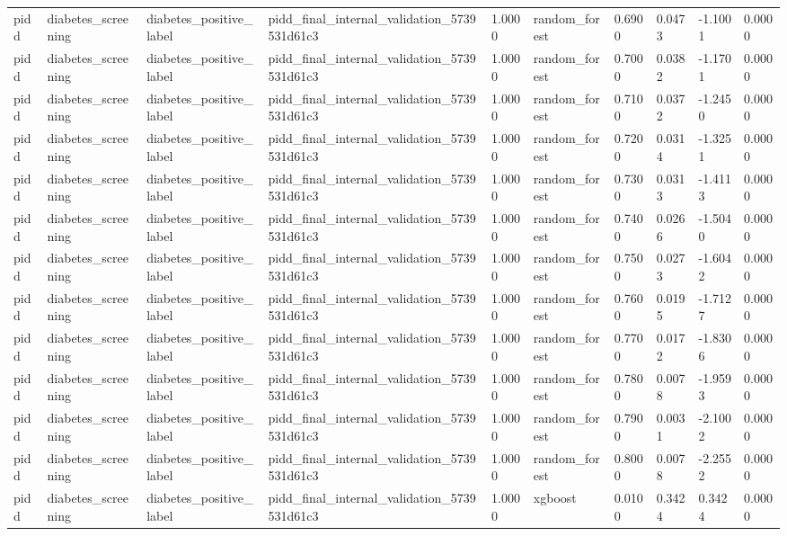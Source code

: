 \begin{tabular}{llllllllll}
pidd & diabetes\_screening & diabetes\_positive\_label & pidd\_final\_internal\_validation\_5739531d61c3 & 1.0000 & random\_forest & 0.6900 & 0.0473 & -1.1001 & 0.0000 \\
pidd & diabetes\_screening & diabetes\_positive\_label & pidd\_final\_internal\_validation\_5739531d61c3 & 1.0000 & random\_forest & 0.7000 & 0.0382 & -1.1701 & 0.0000 \\
pidd & diabetes\_screening & diabetes\_positive\_label & pidd\_final\_internal\_validation\_5739531d61c3 & 1.0000 & random\_forest & 0.7100 & 0.0372 & -1.2450 & 0.0000 \\
pidd & diabetes\_screening & diabetes\_positive\_label & pidd\_final\_internal\_validation\_5739531d61c3 & 1.0000 & random\_forest & 0.7200 & 0.0314 & -1.3251 & 0.0000 \\
pidd & diabetes\_screening & diabetes\_positive\_label & pidd\_final\_internal\_validation\_5739531d61c3 & 1.0000 & random\_forest & 0.7300 & 0.0313 & -1.4113 & 0.0000 \\
pidd & diabetes\_screening & diabetes\_positive\_label & pidd\_final\_internal\_validation\_5739531d61c3 & 1.0000 & random\_forest & 0.7400 & 0.0266 & -1.5040 & 0.0000 \\
pidd & diabetes\_screening & diabetes\_positive\_label & pidd\_final\_internal\_validation\_5739531d61c3 & 1.0000 & random\_forest & 0.7500 & 0.0273 & -1.6042 & 0.0000 \\
pidd & diabetes\_screening & diabetes\_positive\_label & pidd\_final\_internal\_validation\_5739531d61c3 & 1.0000 & random\_forest & 0.7600 & 0.0195 & -1.7127 & 0.0000 \\
pidd & diabetes\_screening & diabetes\_positive\_label & pidd\_final\_internal\_validation\_5739531d61c3 & 1.0000 & random\_forest & 0.7700 & 0.0172 & -1.8306 & 0.0000 \\
pidd & diabetes\_screening & diabetes\_positive\_label & pidd\_final\_internal\_validation\_5739531d61c3 & 1.0000 & random\_forest & 0.7800 & 0.0078 & -1.9593 & 0.0000 \\
pidd & diabetes\_screening & diabetes\_positive\_label & pidd\_final\_internal\_validation\_5739531d61c3 & 1.0000 & random\_forest & 0.7900 & 0.0031 & -2.1002 & 0.0000 \\
pidd & diabetes\_screening & diabetes\_positive\_label & pidd\_final\_internal\_validation\_5739531d61c3 & 1.0000 & random\_forest & 0.8000 & 0.0078 & -2.2552 & 0.0000 \\
pidd & diabetes\_screening & diabetes\_positive\_label & pidd\_final\_internal\_validation\_5739531d61c3 & 1.0000 & xgboost & 0.0100 & 0.3424 & 0.3424 & 0.0000 \\

\end{tabular}
